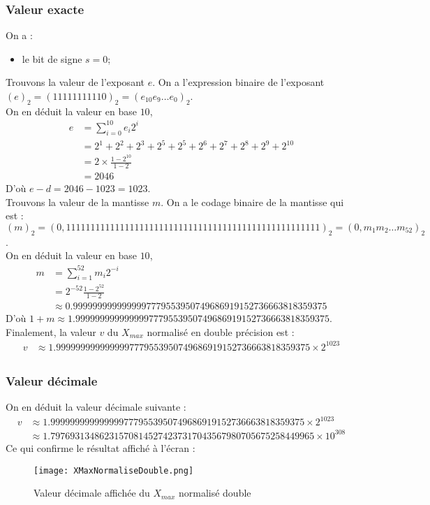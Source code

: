 \documentclass[a4paper, titlepage]{livret} %
\begin{document}
				\subsubsection{Valeur exacte}
					On a : 
					\begin{itemize}
						\item le bit de signe $s = 0$;
					\end{itemize}
					Trouvons la valeur de l'exposant $e$.
					On a l'expression binaire de l'exposant $(e)_{2} = (11111111110)_{2} = (e_{10}e_{9}…e_{0})_{2}$.\\
					On en déduit la valeur en base $10$, 
					\[\begin{aligned}
						e & = \sum_{i=0}^{10} e_{i}2^{i}\\
						  & = 2^{1} + 2^{2} + 2^{3}+ 2^{5}+ 2^{5}+ 2^{6} + 2^{7} + 2^{8} + 2^{9} + 2^{10}\\
						  & = 2\times\frac{1 - 2^{10}}{1 - 2}\\
						  & = 2046
					\end{aligned}\]
					D'où $e-d = 2046 - 1023 = 1023$.\\
					Trouvons la valeur de la mantisse $m$.
					On a le codage binaire de la mantisse qui est : $(m)_{2} = (0,11111111 11111111 11111111 11111111 11111111 11111111 1111)_{2} = (0,m_{1}m_{2}…m_{52})_{2}$.\\
					On en déduit la valeur en base $10$, 
					\[\begin{aligned}
						m & = \sum_{i=1}^{52} m_{i}2^{-i}\\
						  & = 2^{-52}\frac{1 - 2^{52}}{1 - 2}\\
						  & \approx 0.9999999999999997779553950749686919152736663818359375
					\end{aligned}\]
					D'où $1 + m \approx 1.9999999999999997779553950749686919152736663818359375$.\\
					Finalement, la valeur $v$ du $X_{max}$ normalisé en double précision est :
					\[\begin{aligned}
						v & \approx 1.9999999999999997779553950749686919152736663818359375 \times 2^{1023}\\
					\end{aligned}\]

				\subsubsection{Valeur décimale}
					On en déduit la valeur décimale suivante :
					\[\begin{aligned}
						v & \approx 1.9999999999999997779553950749686919152736663818359375 \times 2^{1023}\\
						  & \approx 1.797693134862315708145274237317043567980705675258449965 \times 10^{308}
					\end{aligned}\]
					Ce qui confirme le résultat affiché à l'écran :
					\begin{figure}[!h]
						\centering
  							\texttt{[image: XMaxNormaliseDouble.png]}
  							\caption{Valeur décimale affichée du $X_{max}$ normalisé double}
					\end{figure}
			    	
\end{document}
